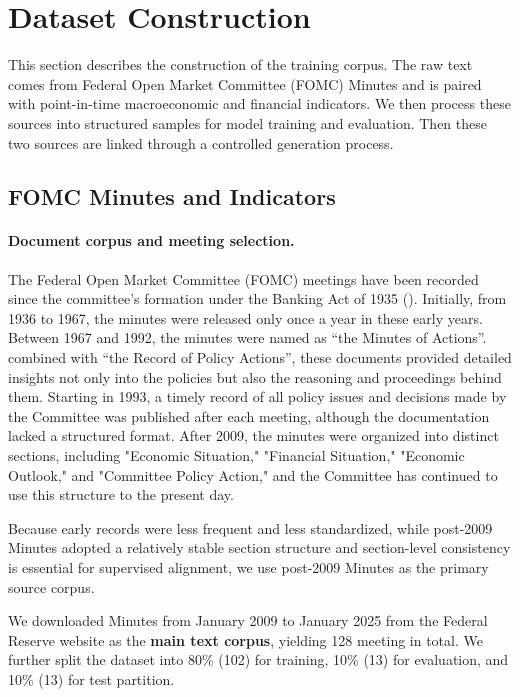 \newcommand{\inputtag}[1]{**\textless #1\textgreater**}



\section{Dataset Construction}\label{ch2:sec:the-dataset}

This section describes the construction of the training corpus. The raw text comes from Federal Open Market Committee (FOMC) Minutes and is paired with point-in-time macroeconomic and financial indicators. We then process these sources into structured samples for model training and evaluation. Then these two sources are linked through a controlled generation process.


\subsection*{FOMC Minutes and Indicators}\label{ch2:sec:raw_data}


\paragraph*{Document corpus and meeting selection.}

The Federal Open Market Committee (FOMC) meetings have been recorded since the committee's formation under the Banking Act of 1935 (\cite{todd2016corollary}). Initially, from 1936 to 1967, the minutes were released only once a year in these early years. Between 1967 and 1992, the minutes were named as ``the Minutes of Actions''. combined with ``the Record of Policy Actions'', these documents provided detailed insights not only into the policies but also the reasoning and proceedings behind them. Starting in 1993, a timely record of all policy issues and decisions made by the Committee was published after each meeting, although the documentation lacked a structured format. After 2009, the minutes were organized into distinct sections, including "Economic Situation," "Financial Situation," "Economic Outlook," and "Committee Policy Action," and the Committee has continued to use this structure to the present day. 

Because early records were less frequent and less standardized, while post-2009 Minutes adopted a relatively stable section structure and section-level consistency is essential for supervised alignment, we use post-2009 Minutes as the primary source corpus.


We downloaded Minutes from January 2009 to January 2025 from the Federal Reserve website as the \textbf{main text corpus}, yielding 128 meeting in total. We further split the dataset into 80\% (102) for training, 10\% (13) for evaluation, and 10\% (13) for test partition. 


